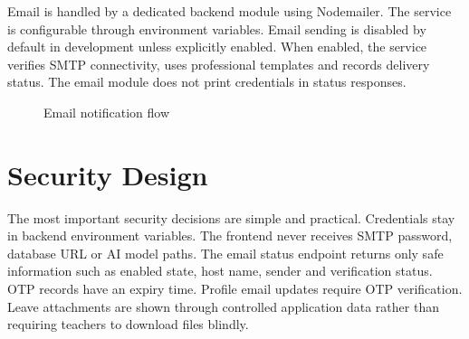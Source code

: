 Email is handled by a dedicated backend module using Nodemailer. The service is configurable through environment variables. Email sending is disabled by default in development unless explicitly enabled. When enabled, the service verifies SMTP connectivity, uses professional templates and records delivery status. The email module does not print credentials in status responses.

\begin{figure}[H]
\centering
{}
\caption{Email notification flow}
\label{fig:email-flow}
\end{figure}

\section{Security Design}

The most important security decisions are simple and practical. Credentials stay in backend environment variables. The frontend never receives SMTP password, database URL or AI model paths. The email status endpoint returns only safe information such as enabled state, host name, sender and verification status. OTP records have an expiry time. Profile email updates require OTP verification. Leave attachments are shown through controlled application data rather than requiring teachers to download files blindly.

